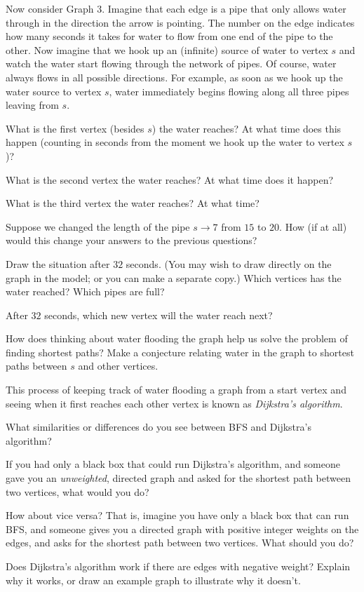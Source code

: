 \documentclass{tufte-handout}
\begin{document}
Now consider Graph 3.  Imagine that each edge is a pipe that only
allows water through in the direction the arrow is pointing.  The
number on the edge indicates how many seconds it takes for water to
flow from one end of the pipe to the other.  Now imagine that we hook
up an (infinite) source of water to vertex $s$ and watch the water
start flowing through the network of pipes.  Of course, water always
flows in all possible directions.  For example, as soon as we hook up
the water source to vertex $s$, water immediately begins flowing
along all three pipes leaving from $s$.
\begin{questions}
  \item What is the first vertex (besides $s$) the water reaches?  At
    what time does this happen (counting in seconds from the moment we
    hook up the water to vertex $s$)?
  \item What is the second vertex the water reaches?  At what time
    does it happen?
  \item What is the third vertex the water reaches?  At what time?
  \item Suppose we changed the length of the pipe $s \to 7$ from $15$
    to $20$.  How (if at all) would this change your answers to the
    previous questions?
  \item Draw the situation after $32$ seconds.  (You may wish to draw
    directly on the graph in the model; or you can make a separate
    copy.)  Which vertices has the water reached?  Which pipes are
    full?
  \item After $32$ seconds, which new vertex will the water reach next?
  \item How does thinking about water flooding the graph help us solve
    the problem of finding shortest paths?  Make a conjecture relating water in
    the graph to shortest paths between $s$ and other vertices.
\end{questions}

\pause

This process of keeping track of water flooding a graph from a start
  vertex and seeing when it first reaches each other vertex is known as
  \emph{Dijkstra's algorithm}.

\begin{questions}
\item What similarities or differences do you see between BFS and
  Dijkstra's algorithm?
\item If you had only a black box that could run Dijkstra's algorithm,
  and someone gave you an \emph{unweighted}, directed graph and asked
  for the shortest path between two vertices, what would you do?
\item How about vice versa?  That is, imagine you have only a black
  box that can run BFS, and someone gives you a directed graph with
  positive integer weights on the edges, and asks for the shortest
  path between two vertices.  What should you do?
\item Does Dijkstra's algorithm work if there are edges with negative
  weight?  Explain why it works, or draw an example graph to illustrate
  why it doesn't.
\end{questions}
\end{document}
